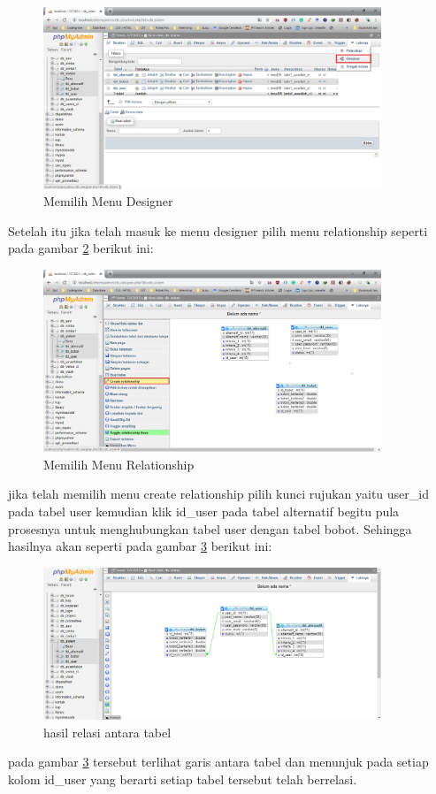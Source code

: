 \begin{figure}[!htbp]
	\centerline{\includegraphics[width=0.90\textwidth]{figures/db/5.png}}
	\caption{Memilih Menu Designer }
	\label{db5}
\end{figure}

Setelah itu jika telah masuk ke menu designer pilih menu relationship seperti pada gambar \ref{db6} berikut ini:
\begin{figure}[!htbp]
	\centerline{\includegraphics[width=0.90\textwidth]{figures/db/6.png}}
	\caption{Memilih Menu Relationship}
	\label{db6}
\end{figure}

jika telah memilih menu create relationship pilih kunci rujukan yaitu user\_id pada tabel user kemudian klik id\_user pada tabel alternatif begitu pula prosesnya untuk menghubungkan tabel user dengan tabel bobot. Sehingga hasilnya akan seperti pada gambar \ref{db7} berikut ini:
\begin{figure}[!htbp]
	\centerline{\includegraphics[width=0.90\textwidth]{figures/db/7.png}}
	\caption{hasil relasi antara tabel}
	\label{db7}
\end{figure}
pada gambar \ref{db7} tersebut terlihat garis antara tabel dan menunjuk pada setiap kolom id\_user yang berarti setiap tabel tersebut telah berrelasi.

